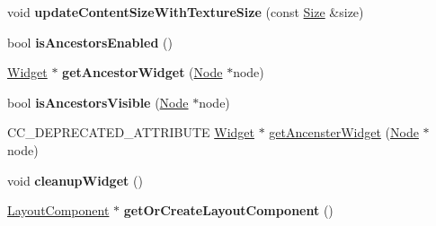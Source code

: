 \begin{DoxyCompactItemize}
void {\bfseries update\+Content\+Size\+With\+Texture\+Size} (const \hyperlink{classSize}{Size} \&size)
\item 
\mbox{\label{classui_1_1Widget_a0b8434ddde4ec9e64f2cc6b5c6fa863e}} 
bool {\bfseries is\+Ancestors\+Enabled} ()
\item 
\mbox{\label{classui_1_1Widget_aee12c3f6dfebd23af7e30d56a3a34e3e}} 
\hyperlink{classui_1_1Widget}{Widget} $\ast$ {\bfseries get\+Ancestor\+Widget} (\hyperlink{classNode}{Node} $\ast$node)
\item 
\mbox{\label{classui_1_1Widget_ab5f99faeef30f00173bb6cb619870a6c}} 
bool {\bfseries is\+Ancestors\+Visible} (\hyperlink{classNode}{Node} $\ast$node)
\item 
C\+C\+\_\+\+D\+E\+P\+R\+E\+C\+A\+T\+E\+D\+\_\+\+A\+T\+T\+R\+I\+B\+U\+TE \hyperlink{classui_1_1Widget}{Widget} $\ast$ \hyperlink{classui_1_1Widget_a84a716b7fe8a0e98444a6a231e011fe0}{get\+Ancenster\+Widget} (\hyperlink{classNode}{Node} $\ast$node)
\item 
\mbox{\label{classui_1_1Widget_a214b524c319c09fe65fd070334052b89}} 
void {\bfseries cleanup\+Widget} ()
\item 
\mbox{\label{classui_1_1Widget_a242c2f08e4b93265d9cf7dcfbdbb5797}} 
\hyperlink{classui_1_1LayoutComponent}{Layout\+Component} $\ast$ {\bfseries get\+Or\+Create\+Layout\+Component} ()
\end{DoxyCompactItemize}
